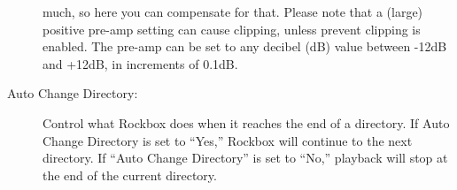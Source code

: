 \begin{description}
{{\begin{description}
            much, so here you can compensate for that. Please note that a 
            (large) positive pre-amp setting can cause clipping, unless 
            prevent clipping is enabled.  The pre-amp can be set to any 
            decibel (dB) value between -12dB and +12dB, in increments of 0.1{}dB.
        \end{description}
        }
    }
    \item[Auto Change Directory: ]Control what Rockbox does when it reaches the end
      of a directory.  If Auto Change Directory is set to ``Yes,'' Rockbox will 
      continue to the next directory.  If ``Auto Change Directory'' is set to ``No,''
      playback will stop at the end of the current directory.
	\end{description}
